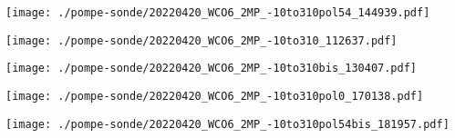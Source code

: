 \begin{frame}
	\texttt{[image: ./pompe-sonde/20220420\_WCO6\_2MP\_-10to310pol54\_144939.pdf]}
\end{frame}
\begin{frame}
	\texttt{[image: ./pompe-sonde/20220420\_WCO6\_2MP\_-10to310\_112637.pdf]}
\end{frame}
\begin{frame}
	\texttt{[image: ./pompe-sonde/20220420\_WCO6\_2MP\_-10to310bis\_130407.pdf]}
\end{frame}
\begin{frame}
	\texttt{[image: ./pompe-sonde/20220420\_WCO6\_2MP\_-10to310pol0\_170138.pdf]}
\end{frame}
\begin{frame}
	\texttt{[image: ./pompe-sonde/20220420\_WCO6\_2MP\_-10to310pol54bis\_181957.pdf]}
\end{frame}

